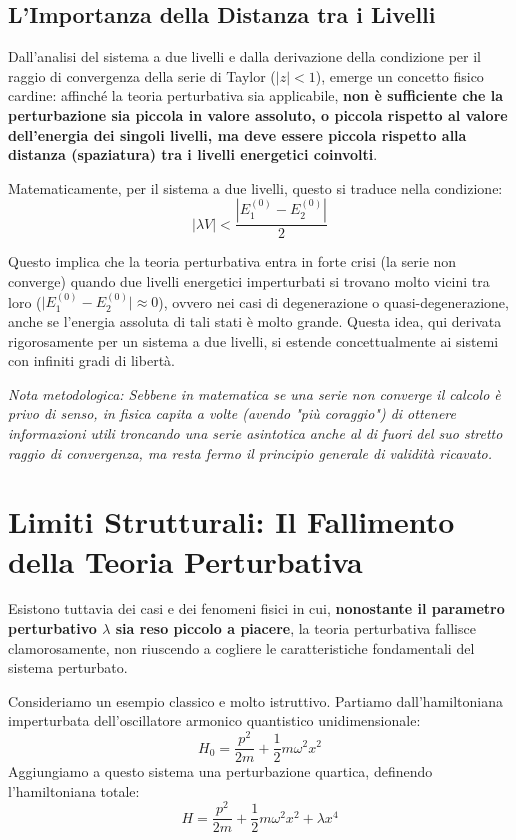 \subsection{L'Importanza della Distanza tra i Livelli}
Dall'analisi del sistema a due livelli e dalla derivazione della condizione per il raggio di convergenza della serie di Taylor ($\vert{}z\vert{} < 1$), emerge un concetto fisico cardine: affinché la teoria perturbativa sia applicabile, \textbf{non è sufficiente che la perturbazione sia piccola in valore assoluto, o piccola rispetto al valore dell'energia dei singoli livelli, ma deve essere piccola rispetto alla distanza (spaziatura) tra i livelli energetici coinvolti}.

Matematicamente, per il sistema a due livelli, questo si traduce nella condizione:
\begin{equation}
|\lambda V| < \frac{|E_1^{(0)} - E_2^{(0)}|}{2}
\end{equation}

Questo implica che la teoria perturbativa entra in forte crisi (la serie non converge) quando due livelli energetici imperturbati si trovano molto vicini tra loro ($\vert{}E_1^{(0)} - E_2^{(0)}\vert{} \approx 0$), ovvero nei casi di degenerazione o quasi-degenerazione, anche se l'energia assoluta di tali stati è molto grande. Questa idea, qui derivata rigorosamente per un sistema a due livelli, si estende concettualmente ai sistemi con infiniti gradi di libertà.

\textit{Nota metodologica: Sebbene in matematica se una serie non converge il calcolo è privo di senso, in fisica capita a volte (avendo "più coraggio") di ottenere informazioni utili troncando una serie asintotica anche al di fuori del suo stretto raggio di convergenza, ma resta fermo il principio generale di validità ricavato.}

\section{Limiti Strutturali: Il Fallimento della Teoria Perturbativa}

Esistono tuttavia dei casi e dei fenomeni fisici in cui, \textbf{nonostante il parametro perturbativo $\lambda$ sia reso piccolo a piacere}, la teoria perturbativa fallisce clamorosamente, non riuscendo a cogliere le caratteristiche fondamentali del sistema perturbato.

Consideriamo un esempio classico e molto istruttivo.
Partiamo dall'hamiltoniana imperturbata dell'oscillatore armonico quantistico unidimensionale:
\begin{equation}
H_0 = \frac{p^2}{2m} + \frac{1}{2} m \omega^2 x^2
\end{equation}
Aggiungiamo a questo sistema una perturbazione quartica, definendo l'hamiltoniana totale:
\begin{equation}
H = \frac{p^2}{2m} + \frac{1}{2} m \omega^2 x^2 + \lambda x^4
\end{equation}

